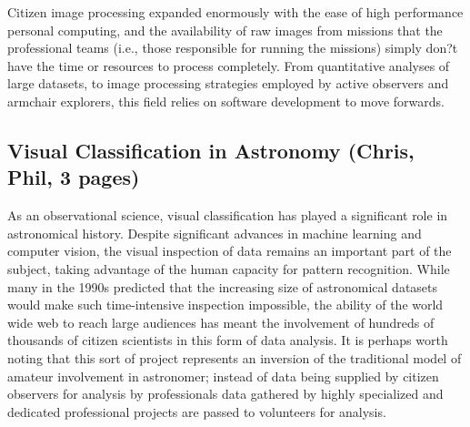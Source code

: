\documentclass{ar2e}
\begin{document}
Citizen image processing expanded enormously with the ease of high performance
personal computing, and the availability of raw images from missions that the
professional teams (i.e., those responsible for running the missions) simply
don?t have the time or resources to process completely.  From quantitative
analyses of large datasets, to image processing strategies employed by active
observers and armchair explorers, this field relies on software development to
move forwards.



\subsection{Visual Classification in Astronomy (\textbf{Chris}, Phil, 3 pages)}
\label{sec:class:astro}


As an observational science, visual classification has played a significant role in astronomical history. Despite significant advances in machine learning and computer vision, the visual inspection of data remains an important part of the subject, taking advantage of the human capacity for pattern recognition. While many in the 1990s predicted that the increasing size of astronomical datasets would make such time-intensive inspection impossible, the ability of the world wide web to reach large audiences has meant the involvement of hundreds of thousands of citizen scientists in this form of data analysis. It is perhaps worth noting that this sort of project represents an inversion of the traditional model of amateur involvement in astronomer; instead of data being supplied by citizen observers for analysis by professionals data gathered by highly specialized and dedicated professional projects are passed to volunteers for analysis. 
\end{document}
